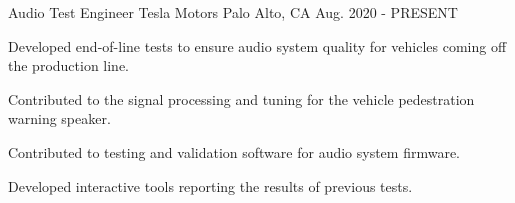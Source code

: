 

\begin{cventries}

  \cventry
    {Audio Test Engineer} %
    {Tesla Motors} %
    {Palo Alto, CA} %
    {Aug. 2020 - PRESENT} %
    {
      \begin{cvitems} %
        \item {Developed end-of-line tests to ensure audio system quality for vehicles coming off the production line.}
        \item {Contributed to the signal processing and tuning for the vehicle pedestration warning speaker.}
        \item {Contributed to testing and validation software for audio system firmware.}
        \item {Developed interactive tools reporting the results of previous tests.}
      \end{cvitems}
    }



\end{cventries}
